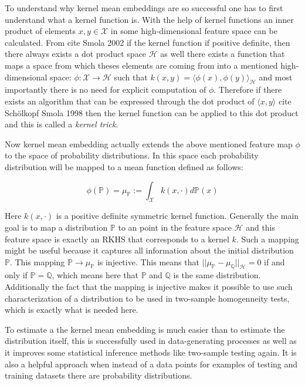 To understand why kernel mean embeddings are so successful one has to first understand what a kernel function is. With
the help of kernel functions an inner product of elements $x, y \in \mathcal{X}$ in some high-dimensional feature space can be calculated. From cite Smola 2002 if the kernel function if positive definite, then there always exists a dot product space $\mathscr{H}$ as well there exists a function that maps a space from which theses elements are coming from into a mentioned high-dimensional space: $\phi : \mathcal{X} \rightarrow \mathscr{H}$ such that $k(x, y) = {\langle\phi(x), \phi(y)\rangle}_{\mathscr{H}}$ and most importantly there is no need for explicit computation of $\phi$. Therefore if there exists an algorithm that can be expressed through the dot product of $\langle x, y \rangle$ cite Schölkopf Smola 1998 then the kernel function can be applied to this dot product and this is called a \textit{kernel trick}.

Now kernel mean embedding actually extends the above mentioned feature map $\phi$ to the space of probability distributions. In this space each probability distribution will be mapped to a mean function defined as follows:

\begin{equation}
    \phi(\mathds{P}) = \mu_{\mathds{P}} := \int_{\mathcal{X}}k(x, \cdot)d\mathds{P}(x)
\end{equation}

Here $k(x, \cdot)$ is a positive definite symmetric kernel function. Generally the main goal is to map a distribution $\mathds{P}$ to an point in the feature space $\mathscr{H}$ and this feature space is exactly an RKHS that corresponds to a kernel $k$. Such a mapping might be useful because it captures all information about the initial distribution $\mathds{P}$. This mapping $\mathds{P} \rightarrow \mu_\mathds{P}$ is injective. This means that $||\mu_\mathds{P} - \mu_\mathds{Q}||_{\mathscr{H}} = 0$ if and only if $\mathds{P} = \mathds{Q}$, which means here that $\mathds{P}$ and $\mathds{Q}$ is the same distribution. Additionally the fact that the mapping is injective makes it possible to use such characterization of a distribution to be used in two-sample homogenneity tests, which is exactly what is needed here. 

To estimate a the kernel mean embedding is much easier than to estimate the distribution itself, this is successfully used in data-generating processes as well as it improves some statistical inference methods like two-sample testing again. It is also a helpful approach when instead of a data points for examples of testing and training datasets there are probability distributions. 

